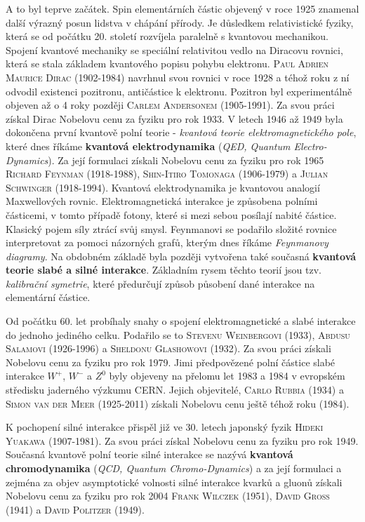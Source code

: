     A to byl teprve začátek. Spin elementárních částic objevený v roce 1925 znamenal další výrazný
    posun lidstva v chápání přírody. Je důsledkem relativistické fyziky, která se od počátku 20.
    století rozvíjela paralelně s kvantovou mechanikou. Spojení kvantové mechaniky se speciální
    relativitou vedlo na Diracovu rovnici, která se stala základem kvantového popisu pohybu
    elektronu. \textsc{Paul Adrien Maurice Dirac} (1902-1984) navrhnul svou rovnici v roce 1928 a
    téhož roku z ní odvodil existenci pozitronu, antičástice k elektronu. Pozitron byl
    experimentálně objeven až o 4 roky později \textsc{Carlem Andersonem} (1905-1991). Za svou práci
    získal Dirac Nobelovu cenu za fyziku pro rok 1933. V letech 1946 až 1949 byla dokončena první
    kvantově polní teorie - \emph{kvantová teorie elektromagnetického pole}, které dnes říkáme
    \textbf{kvantová elektrodynamika} (\emph{QED, Quantum Electro-Dynamics}). Za její formulaci
    získali Nobelovu cenu za fyziku pro rok 1965 \textsc{Richard Feynman} (1918-1988),
    \textsc{Shin-Itiro Tomonaga} (1906-1979) a \textsc{Julian Schwinger} (1918-1994). Kvantová
    elektrodynamika je kvantovou analogií Maxwellových rovnic. Elektromagnetická interakce je
    způsobena polními částicemi, v tomto případě fotony, které si mezi sebou posílají nabité
    částice. Klasický pojem síly ztrácí svůj smysl. Feynmanovi se podařilo složité rovnice
    interpretovat za pomoci názorných grafů, kterým dnes říkáme \emph{Feynmanovy diagramy}. Na
    obdobném základě byla později vytvořena také současná \textbf{kvantová teorie slabé a silné
    interakce}. Základním rysem těchto teorií jsou tzv. \emph{kalibrační symetrie}, které předurčují
    způsob působení dané interakce na elementární částice.

    Od počátku 60. let probíhaly snahy o spojení elektromagnetické a slabé interakce do jednoho
    jediného celku. Podařilo se to \textsc{Stevenu Weinbergovi} (1933), \textsc{Abdusu Salamovi}
    (1926-1996) a \textsc{Sheldonu Glashowovi} (1932). Za svou práci získali Nobelovu cenu za fyziku
    pro rok 1979. Jimi předpovězené polní částice slabé interakce \(W^+\), \(W^-\) a \(Z^0\) byly
    objeveny na přelomu let 1983 a 1984 v evropském středisku jaderného výzkumu CERN. Jejich
    objevitelé, \textsc{Carlo Rubbia} (1934) a \textsc{Simon van der Meer} (1925-2011) získali
    Nobelovu cenu ještě téhož roku (1984).

    K pochopení silné interakce přispěl již ve 30. letech japonský fyzik \textsc{Hideki Yuakawa}
    (1907-1981). Za svou práci získal Nobelovu cenu za fyziku pro rok 1949. Současná kvantově polní
    teorie silné interakce se nazývá \textbf{kvantová chromodynamika} (\emph{QCD, Quantum
    Chromo-Dynamics}) a za její formulaci a zejména za objev asymptotické volnosti silné interakce
    kvarků a gluonů získali Nobelovu cenu za fyziku pro rok 2004 \textsc{Frank Wilczek} (1951),
    \textsc{David Gross} (1941) a \textsc{David Politzer} (1949).
    
